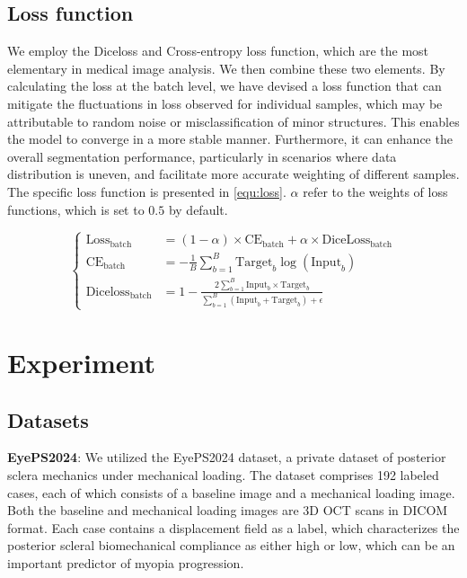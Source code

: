 \documentclass[AMA,Times1COL]{WileyNJDv5} %
\begin{document}
\subsection{Loss function}
We employ the Diceloss and Cross-entropy loss function, which are the most elementary in medical image analysis. We then combine these two elements. By calculating the loss at the batch level, we have devised a loss function that can mitigate the fluctuations in loss observed for individual samples, which may be attributable to random noise or misclassification of minor structures. This enables the model to converge in a more stable manner. Furthermore, it can enhance the overall segmentation performance, particularly in scenarios where data distribution is uneven, and facilitate more accurate weighting of different samples. The specific loss function is presented in \eqref{equ:loss}. $\alpha$ refer to the weights of loss functions, which is set to $0.5$ by default.

\begin{equation}
\label{equ:loss}
\left\{
\begin{aligned}
\text{Loss}_{\text{batch}} &= (1-\alpha)\times\text{CE}_{\text{batch}}+\alpha\times\text{DiceLoss}_{\text{batch}} \\
\mathrm{CE}_{\mathrm{batch}} &= -\frac{1}{B}\sum_{b=1}^{B}\text{Target}_{b}\log(\text{Input}_{b}) \\
\mathrm{Diceloss}_{\mathrm{batch}} &= 1-\frac{2\sum_{b=1}^{B}\mathrm{Input}_{b}^{}\times\mathrm{Target}_{b}^{}}{\sum_{b=1}^{B}\left(\mathrm{Input}_{b}^{}+\mathrm{Target}_{b}^{}\right)+\epsilon}
\end{aligned}
\right.
\end{equation}

\section{Experiment}
\subsection{Datasets}
\textbf{EyePS2024}: We utilized the EyePS2024 dataset, a private dataset of posterior sclera mechanics under mechanical loading. The dataset comprises 192 labeled cases, each of which consists of a baseline image and a mechanical loading image. Both the baseline and mechanical loading images are 3D OCT scans in DICOM format. Each case contains a displacement field as a label, which characterizes the posterior scleral biomechanical compliance as either high or low, which can be an important predictor of myopia progression.
\end{document}
